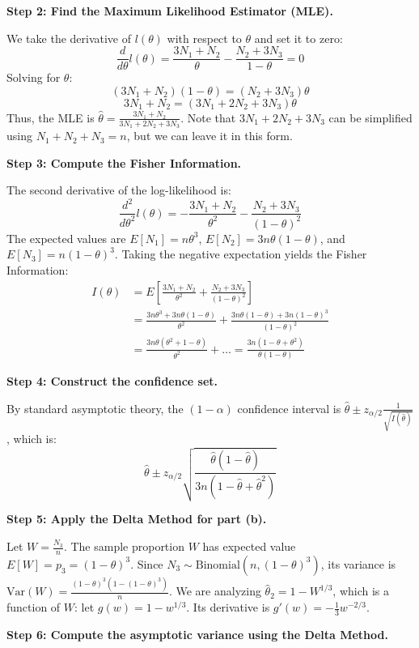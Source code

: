 \begin{solution}
\textbf{Step 2: Find the Maximum Likelihood Estimator (MLE).}

We take the derivative of $l(\theta)$ with respect to $\theta$ and set it to zero:
\[ \frac{d}{d\theta} l(\theta) = \frac{3N_1 + N_2}{\theta} - \frac{N_2 + 3N_3}{1-\theta} = 0 \]
Solving for $\theta$:
\[ (3N_1 + N_2)(1-\theta) = (N_2 + 3N_3)\theta \]
\[ 3N_1 + N_2 = (3N_1 + 2N_2 + 3N_3)\theta \]
Thus, the MLE is $\hat{\theta} = \frac{3N_1 + N_2}{3N_1 + 2N_2 + 3N_3}$. Note that $3N_1 + 2N_2 + 3N_3$ can be simplified using $N_1+N_2+N_3 = n$, but we can leave it in this form.

\textbf{Step 3: Compute the Fisher Information.}

The second derivative of the log-likelihood is:
\[ \frac{d^2}{d\theta^2} l(\theta) = -\frac{3N_1 + N_2}{\theta^2} - \frac{N_2 + 3N_3}{(1-\theta)^2} \]
The expected values are $E[N_1] = n\theta^3$, $E[N_2] = 3n\theta(1-\theta)$, and $E[N_3] = n(1-\theta)^3$.
Taking the negative expectation yields the Fisher Information:
\begin{align*}
I(\theta) &= E\left[ \frac{3N_1 + N_2}{\theta^2} + \frac{N_2 + 3N_3}{(1-\theta)^2} \right] \\
&= \frac{3n\theta^3 + 3n\theta(1-\theta)}{\theta^2} + \frac{3n\theta(1-\theta) + 3n(1-\theta)^3}{(1-\theta)^2} \\
&= \frac{3n\theta(\theta^2 + 1 - \theta)}{\theta^2} + \dots = \frac{3n(1-\theta+\theta^2)}{\theta(1-\theta)}
\end{align*}

\textbf{Step 4: Construct the confidence set.}

By standard asymptotic theory, the $(1-\alpha)$ confidence interval is $\hat{\theta} \pm z_{\alpha/2} \frac{1}{\sqrt{I(\hat{\theta})}}$, which is:
\[ \hat{\theta} \pm z_{\alpha/2} \sqrt{\frac{\hat{\theta}(1-\hat{\theta})}{3n(1-\hat{\theta}+\hat{\theta}^2)}} \]

\textbf{Step 5: Apply the Delta Method for part (b).}

Let $W = \frac{N_3}{n}$. The sample proportion $W$ has expected value $E[W] = p_3 = (1-\theta)^3$.
Since $N_3 \sim \text{Binomial}(n, (1-\theta)^3)$, its variance is $\text{Var}(W) = \frac{(1-\theta)^3(1-(1-\theta)^3)}{n}$.
We are analyzing $\hat{\theta}_2 = 1 - W^{1/3}$, which is a function of $W$: let $g(w) = 1 - w^{1/3}$.
Its derivative is $g'(w) = -\frac{1}{3} w^{-2/3}$.

\textbf{Step 6: Compute the asymptotic variance using the Delta Method.}


\end{solution}
